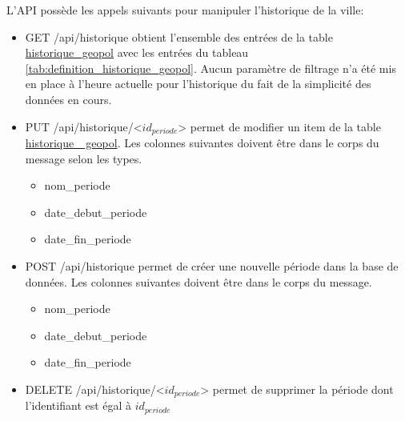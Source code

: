 L'\ac{API}  possède les appels suivants pour manipuler l'historique de la ville:
\begin{itemize}
    \item GET /api/historique obtient l'ensemble des entrées de la table \ul{historique\_geopol} avec les entrées du tableau \ref{tab:definition_historique_geopol}. Aucun paramètre de filtrage n'a été mis en place à l'heure actuelle pour l'historique du fait de la simplicité des données en cours. 
    \item PUT /api/historique/<$id_{periode}$> permet de modifier un item de la table \ul{historique\_ geopol}. Les colonnes suivantes doivent être dans le corps du message selon les types. 
    \begin{itemize}
        \item nom\_periode 
        \item date\_debut\_periode
        \item date\_fin\_periode
    \end{itemize}
    \item POST /api/historique permet de créer une nouvelle période dans la base de données. Les colonnes suivantes doivent être dans le corps du message.
    \begin{itemize}
        \item nom\_periode 
        \item date\_debut\_periode
        \item date\_fin\_periode
    \end{itemize}
    \item DELETE /api/historique/<$id_{periode}$> permet de supprimer la période dont l'identifiant est égal à $id_{periode}$
\end{itemize}


